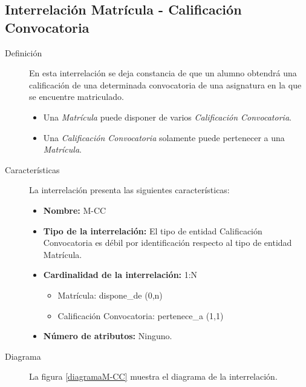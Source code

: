 \subsection{Interrelación Matrícula - Calificación Convocatoria}

   \begin{description}
      \item[Definición] En esta interrelación se deja constancia de que un
      alumno obtendrá una calificación de una determinada convocatoria de una
      asignatura en la que se encuentre matriculado.

      \begin{itemize}
       \item Una \textit{Matrícula} puede disponer de varios
             \textit{Calificación Convocatoria}.
       \item Una \textit{Calificación Convocatoria} solamente puede pertenecer a
             una \textit{Matrícula}.
      \end{itemize}

      \item[Características] La interrelación presenta las siguientes
                             características:

         \begin{itemize}
            \item \textbf{Nombre:} M-CC
            \item \textbf{Tipo de la interrelación:} El tipo de entidad
                  Calificación Convocatoria es débil por identificación respecto
                  al tipo de entidad Matrícula.
            \item \textbf{Cardinalidad de la interrelación:} 1:N
                  \begin{itemize}
                     \item Matrícula: dispone\_de (0,n)
                     \item Calificación Convocatoria: pertenece\_a (1,1)
                  \end{itemize}
            \item \textbf{Número de atributos:} Ninguno.
         \end{itemize}

      \item[Diagrama] La figura \ref{diagramaM-CC} muestra el diagrama de la
                      interrelación.


\end{description}
